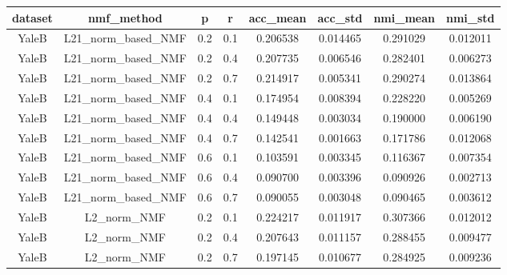 \begin{table}[p]
\centering
\begin{tabular}{cccccccc}
\hline
\textbf{dataset} & \textbf{nmf\_method}  & \textbf{p} & \textbf{r} & \textbf{acc\_mean} & \textbf{acc\_std} & \textbf{nmi\_mean} & \textbf{nmi\_std} \\\hline
YaleB            & L21\_norm\_based\_NMF & 0.2        & 0.1        & 0.206538           & 0.014465          & 0.291029           & 0.012011          \\
YaleB            & L21\_norm\_based\_NMF & 0.2        & 0.4        & 0.207735           & 0.006546          & 0.282401           & 0.006273          \\
YaleB            & L21\_norm\_based\_NMF & 0.2        & 0.7        & 0.214917           & 0.005341          & 0.290274           & 0.013864          \\
YaleB            & L21\_norm\_based\_NMF & 0.4        & 0.1        & 0.174954           & 0.008394          & 0.228220           & 0.005269          \\
YaleB            & L21\_norm\_based\_NMF & 0.4        & 0.4        & 0.149448           & 0.003034          & 0.190000           & 0.006190          \\
YaleB            & L21\_norm\_based\_NMF & 0.4        & 0.7        & 0.142541           & 0.001663          & 0.171786           & 0.012068          \\
YaleB            & L21\_norm\_based\_NMF & 0.6        & 0.1        & 0.103591           & 0.003345          & 0.116367           & 0.007354          \\
YaleB            & L21\_norm\_based\_NMF & 0.6        & 0.4        & 0.090700           & 0.003396          & 0.090926           & 0.002713          \\
YaleB            & L21\_norm\_based\_NMF & 0.6        & 0.7        & 0.090055           & 0.003048          & 0.090465           & 0.003612          \\
YaleB            & L2\_norm\_NMF         & 0.2        & 0.1        & 0.224217           & 0.011917          & 0.307366           & 0.012012          \\
YaleB            & L2\_norm\_NMF         & 0.2        & 0.4        & 0.207643           & 0.011157          & 0.288455           & 0.009477          \\
YaleB            & L2\_norm\_NMF         & 0.2        & 0.7        & 0.197145           & 0.010677          & 0.284925           & 0.009236          \\

\end{tabular}
\end{table}
